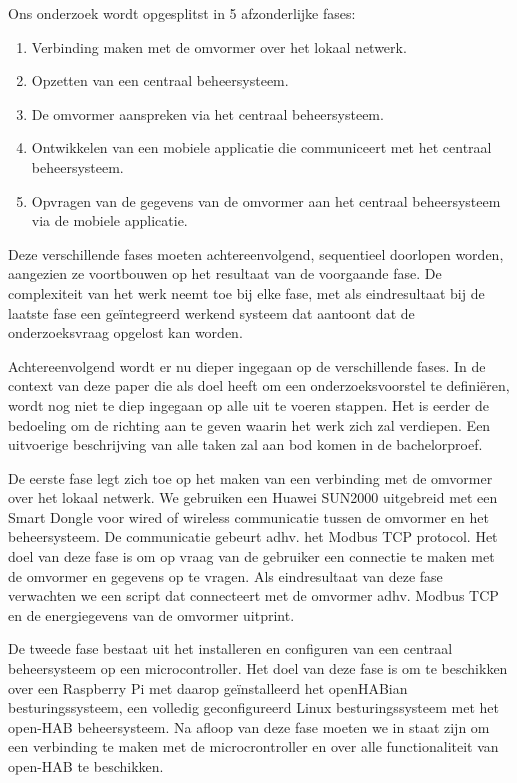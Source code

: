 \documentclass{hogent-article}
\begin{document}
    Ons onderzoek wordt opgesplitst in 5 afzonderlijke fases:
    \begin{enumerate}
        \item Verbinding maken met de omvormer over het lokaal netwerk.
        \item Opzetten van een centraal beheersysteem.
        \item De omvormer aanspreken via het centraal beheersysteem.
        \item Ontwikkelen van een mobiele applicatie die communiceert met het centraal beheersysteem.
        \item Opvragen van de gegevens van de omvormer aan het centraal beheersysteem via de mobiele applicatie.
    \end{enumerate}
    Deze verschillende fases moeten achtereenvolgend, sequentieel doorlopen worden, aangezien ze voortbouwen op het resultaat van de voorgaande fase. De complexiteit van het werk neemt toe bij elke fase, met als eindresultaat bij de laatste fase een geïntegreerd werkend systeem dat aantoont dat de onderzoeksvraag opgelost kan worden.
    
    Achtereenvolgend wordt er nu dieper ingegaan op de verschillende fases. In de context van deze paper die als doel heeft om een onderzoeksvoorstel te definiëren, wordt nog niet te diep ingegaan op alle uit te voeren stappen. Het is eerder de bedoeling om de richting aan te geven waarin het werk zich zal verdiepen. Een uitvoerige beschrijving van alle taken zal aan bod komen in de bachelorproef.
    
    De eerste fase legt zich toe op het maken van een verbinding met de omvormer over het lokaal netwerk. We gebruiken een Huawei SUN2000 uitgebreid met een Smart Dongle voor wired of wireless communicatie tussen de omvormer en het beheersysteem. De communicatie gebeurt adhv. het Modbus TCP protocol. Het doel van deze fase is om op vraag van de gebruiker een connectie te maken met de omvormer en gegevens op te vragen. Als eindresultaat van deze fase verwachten we een script dat connecteert met de omvormer adhv. Modbus TCP en de energiegevens van de omvormer uitprint.
    
    De tweede fase bestaat uit het installeren en configuren van een centraal beheersysteem op een microcontroller. Het doel van deze fase is om te beschikken over een Raspberry Pi met daarop geïnstalleerd het openHABian besturingssysteem, een volledig geconfigureerd Linux besturingssysteem met het open-HAB beheersysteem. Na afloop van deze fase moeten we in staat zijn om een verbinding te maken met de microcrontroller en over alle functionaliteit van open-HAB te beschikken.
    
\end{document}
